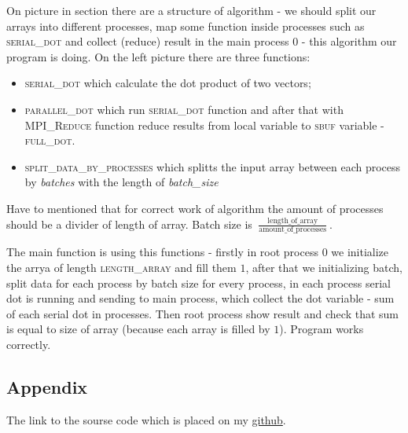 \documentclass[%
12pt, %
final, %
oneside, %
onecolumn, %
centertags]{article} %
\theoremstyle{plain}
\theoremstyle{definition}
\theoremstyle{remark}
\begin{document}
On picture in section  there are a structure of algorithm - we should split our arrays into different processes, map some function inside processes such as \textsc{serial\_dot} and collect (reduce) result in the main process $0$ - this algorithm our program is doing. On the left picture there are three functions:

\begin{itemize}
	\item \textsc{serial\_dot} which calculate the dot product of two vectors;
	\item \textsc{parallel\_dot} which run \textsc{serial\_dot} function and after that with \textsc{MPI\_Reduce} function reduce results from local variable to \textsc{sbuf} variable - \textsc{full\_dot}.
	\item \textsc{split\_data\_by\_processes} which splitts the input array between each process by \textit{batches} with the length of \textit{batch\_size}
\end{itemize}

Have to mentioned that for correct work of algorithm the amount of processes should be a divider of length of array. Batch size is $\frac{\operatorname{length\_of\_array}}{\operatorname{amount\_of\_processes}}$.

The main function is using this functions - firstly in root process $0$ we initialize the arrya of length \textsc{length\_array} and fill them $1$, after that we initializing batch, split data for each process by batch size for every process, in each process serial dot is running and sending to main process, which collect the dot variable - sum of each serial dot in processes. Then root process show result and check that sum is equal to size of array (because each array is filled by $1$). Program works correctly.


\subsection{Appendix}

The link to the sourse code which is placed on my \href{https://github.com/aptmess/parallel_algorithms}{github}.
\end{document}
